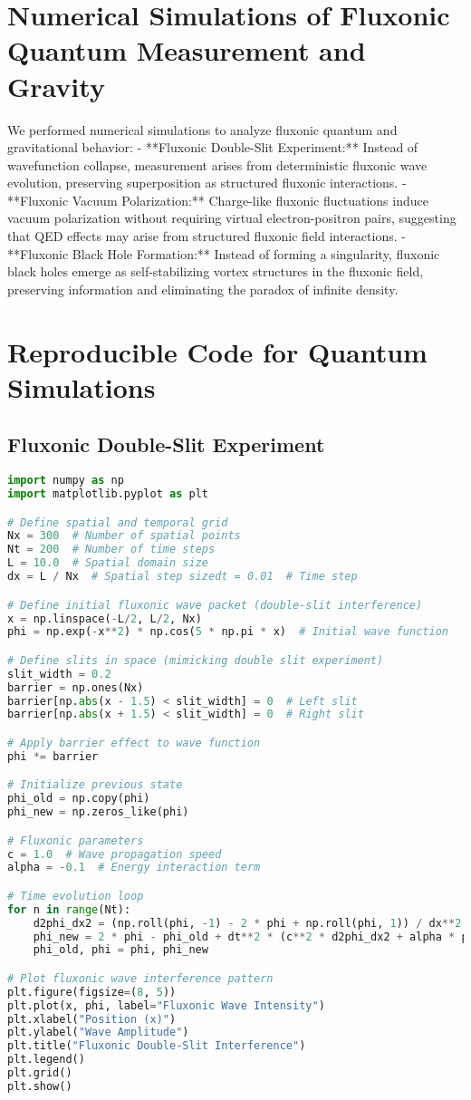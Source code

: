 \documentclass{article}
\begin{document}
\section{Numerical Simulations of Fluxonic Quantum Measurement and Gravity}
We performed numerical simulations to analyze fluxonic quantum and gravitational behavior:
- **Fluxonic Double-Slit Experiment:** Instead of wavefunction collapse, measurement arises from deterministic fluxonic wave evolution, preserving superposition as structured fluxonic interactions.
- **Fluxonic Vacuum Polarization:** Charge-like fluxonic fluctuations induce vacuum polarization without requiring virtual electron-positron pairs, suggesting that QED effects may arise from structured fluxonic field interactions.
- **Fluxonic Black Hole Formation:** Instead of forming a singularity, fluxonic black holes emerge as self-stabilizing vortex structures in the fluxonic field, preserving information and eliminating the paradox of infinite density.

\section{Reproducible Code for Quantum Simulations}
\subsection{Fluxonic Double-Slit Experiment}
\begin{lstlisting}[language=Python]
import numpy as np
import matplotlib.pyplot as plt

# Define spatial and temporal grid
Nx = 300  # Number of spatial points
Nt = 200  # Number of time steps
L = 10.0  # Spatial domain size
dx = L / Nx  # Spatial step sizedt = 0.01  # Time step

# Define initial fluxonic wave packet (double-slit interference)
x = np.linspace(-L/2, L/2, Nx)
phi = np.exp(-x**2) * np.cos(5 * np.pi * x)  # Initial wave function

# Define slits in space (mimicking double slit experiment)
slit_width = 0.2
barrier = np.ones(Nx)
barrier[np.abs(x - 1.5) < slit_width] = 0  # Left slit
barrier[np.abs(x + 1.5) < slit_width] = 0  # Right slit

# Apply barrier effect to wave function
phi *= barrier

# Initialize previous state
phi_old = np.copy(phi)
phi_new = np.zeros_like(phi)

# Fluxonic parameters
c = 1.0  # Wave propagation speed
alpha = -0.1  # Energy interaction term

# Time evolution loop
for n in range(Nt):
    d2phi_dx2 = (np.roll(phi, -1) - 2 * phi + np.roll(phi, 1)) / dx**2
    phi_new = 2 * phi - phi_old + dt**2 * (c**2 * d2phi_dx2 + alpha * phi)
    phi_old, phi = phi, phi_new

# Plot fluxonic wave interference pattern
plt.figure(figsize=(8, 5))
plt.plot(x, phi, label="Fluxonic Wave Intensity")
plt.xlabel("Position (x)")
plt.ylabel("Wave Amplitude")
plt.title("Fluxonic Double-Slit Interference")
plt.legend()
plt.grid()
plt.show()
\end{lstlisting}
\end{document}
